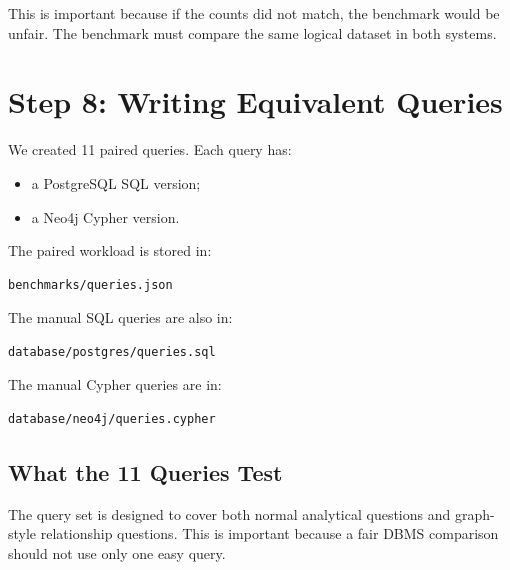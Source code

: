 \documentclass[11pt]{article}
\begin{document}
This is important because if the counts did not match, the benchmark would be unfair.
The benchmark must compare the same logical dataset in both systems.

\section{Step 8: Writing Equivalent Queries}

We created 11 paired queries.
Each query has:

\begin{itemize}
    \item a PostgreSQL SQL version;
    \item a Neo4j Cypher version.
\end{itemize}

The paired workload is stored in:

\begin{verbatim}
benchmarks/queries.json
\end{verbatim}

The manual SQL queries are also in:

\begin{verbatim}
database/postgres/queries.sql
\end{verbatim}

The manual Cypher queries are in:

\begin{verbatim}
database/neo4j/queries.cypher
\end{verbatim}

\subsection{What the 11 Queries Test}

The query set is designed to cover both normal analytical questions and graph-style relationship questions.
This is important because a fair DBMS comparison should not use only one easy query.
\end{document}
